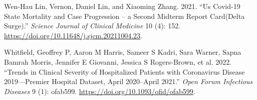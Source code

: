 \documentclass[
  letterpaper,
  DIV=11,
  numbers=noendperiod]{scrartcl}
\newlength{\cslhangindent}
\newenvironment{CSLReferences}[2] %
 {\begin{list}{}{%
  \setlength{\itemindent}{0pt}
  \setlength{\leftmargin}{0pt}
  \setlength{\parsep}{0pt}
  \ifodd #1
   \setlength{\leftmargin}{\cslhangindent}
   \setlength{\itemindent}{-1\cslhangindent}
  \fi
  \setlength{\itemsep}{#2\baselineskip}}}
 {\end{list}}
\begin{document}
\begin{CSLReferences}{1}{0}
Wen-Hau Lin, Vernon, Daniel Lin, and Xiaoming Zhang. 2021. {``Us
Covid-19 State Mortality and Case Progression -- a Second Midterm Report
Card({Delta} Surge).''} \emph{Science Journal of Clinical Medicine} 10
(4): 152. \url{https://doi.org/10.11648/j.sjcm.20211004.23}.

Whitfield, Geoffrey P, Aaron M Harris, Sameer S Kadri, Sara Warner,
Sapna Bamrah Morris, Jennifer E Giovanni, Jessica S Rogers-Brown, et al.
2022. {``Trends in Clinical Severity of Hospitalized Patients with
Coronavirus Disease 2019---Premier Hospital Dataset, April 2020--April
2021.''} \emph{Open Forum Infectious Diseases} 9 (1): ofab599.
\url{https://doi.org/10.1093/ofid/ofab599}.

\end{CSLReferences}
\end{document}
